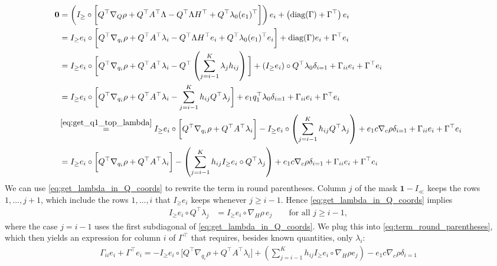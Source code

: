 \documentclass[a4paper,12pt]{article}
\theoremstyle{definition}
\begin{document}
\begin{align}
    \mathbf{0} &= \left(I_\geq \circ \bigg[Q^\top \nabla_{Q} \rho + Q^\top A^\top \Lambda - Q^\top \Lambda H^\top + Q^\top \lambda_0 (e_{1})^\top\bigg]\right)e_i + \left(\text{diag}(\Gamma) + \Gamma^\top\right) e_i \nonumber
    \\
    &= I_\geq e_i \circ \bigg[Q^\top \nabla_{q_i} \rho + Q^\top A^\top \lambda_i - Q^\top \Lambda H^\top e_i + Q^\top \lambda_0 (e_{1})^\top e_i\bigg] + \text{diag}(\Gamma)e_i + \Gamma^\top e_i \nonumber
    \\
    &= I_\geq e_i \circ \bigg[Q^\top \nabla_{q_i} \rho + Q^\top A^\top \lambda_i - Q^\top \left(\sum_{j=i-1}^{K} \lambda_j h_{ij}\right)\bigg] +(I_\geq e_i) \circ Q^\top \lambda_0 \delta_{i=1} + \Gamma_{ii}e_i + \Gamma^\top e_i \nonumber
    \\
    &= I_\geq e_i \circ \bigg[Q^\top \nabla_{q_i} \rho + Q^\top A^\top \lambda_i - \sum_{j=i-1}^{K} h_{ij}Q^\top\lambda_j\bigg] + e_1q_1^\top \lambda_0 \delta_{i=1} + \Gamma_{ii}e_i + \Gamma^\top e_i \nonumber
    \\
    &\!\overset{\eqref{eq:get_q1_top_lambda}}{=} I_\geq e_i \circ \bigg[Q^\top \nabla_{q_i} \rho + Q^\top A^\top \lambda_i\bigg] - I_\geq e_i \circ \left(\sum_{j=i-1}^{K} h_{ij}Q^\top\lambda_j\right) + e_1c\nabla_{c} \rho \delta_{i=1} + \Gamma_{ii}e_i + \Gamma^\top e_i \nonumber
    \\
    &= I_\geq e_i \circ \bigg[Q^\top \nabla_{q_i} \rho + Q^\top A^\top \lambda_i\bigg] - \left(\sum_{j=i-1}^{K} h_{ij} I_\geq e_i \circ Q^\top\lambda_j\right) + e_1c\nabla_{c} \rho \delta_{i=1} + \Gamma_{ii}e_i + \Gamma^\top e_i \label{eq:term_round_parentheses}
\end{align}
We can use \eqref{eq:get_lambda_in_Q_coords} to rewrite the term in round parentheses. Column $j$ of the mask $\mathbf{1} - I_{\ll}$ keeps the rows $1, \dots, j+1$, which include the rows $1, \dots, i$ that $I_\geq e_i$ keeps whenever $j \geq i - 1$. Hence \eqref{eq:get_lambda_in_Q_coords} implies
\begin{align}
    I_{\geq}e_i \circ Q^\top \lambda_j &= I_{\geq}e_i \circ \nabla_{H} \rho\, e_j \qquad \text{for all } j \geq i - 1, \nonumber
\end{align}
where the case $j = i - 1$ uses the first subdiagonal of \eqref{eq:get_lambda_in_Q_coords}.
We plug this into \eqref{eq:term_round_parentheses}, which then yields an expression for column $i$ of $\Gamma^\top$ that requires, besides known quantities, only $\lambda_i$:
\begin{align}
    \Gamma_{ii}e_i + \Gamma^\top e_i = - I_\geq e_i \circ \bigg[Q^\top \nabla_{q_i} \rho + Q^\top A^\top \lambda_i\bigg] + \left(\sum_{j=i-1}^{K} h_{ij} I_\geq e_i \circ \nabla_{H} \rho e_j\right) - e_1c\nabla_{c} \rho \delta_{i=1} \label{eq:get_Gamma_i}
\end{align}
\end{document}
